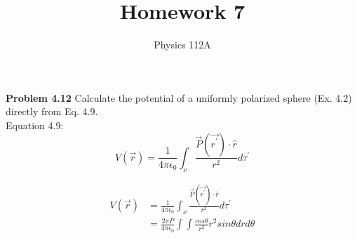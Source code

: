 \documentclass{article}
\title{Homework 7}
\author{Physics 112A}
\date{}
\begin{document}
\maketitle

\textbf{Problem 4.12}
Calculate the potential of a uniformly polarized sphere (Ex. 4.2) directly from
Eq. 4.9. \\

Equation 4.9:
$$V(\vec{r}) = \frac{1}{4 \pi \epsilon_0} \int_{\nu} \frac{\vec{P}(\vec{r^\prime}) \cdot \hat{r}}{r^2} d\tau^\prime  $$

\begin{equation*}
\begin{split}
	V(\vec{r}) & = \frac{1}{4 \pi \epsilon_0} \int_{\nu} \frac{\vec{P}(\vec{r^\prime}) \cdot \hat{r}}{r^2} d\tau^\prime \\
	& = \frac{2 \pi P}{4 \pi \epsilon_0} \int \int \frac{cos \theta}{r^2} r^2 sin \theta dr d\theta
\end{split}
\end{equation*}
\end{document}
